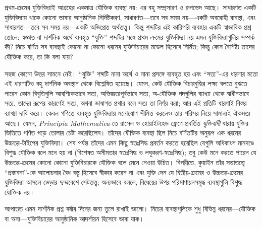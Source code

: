 \documentclass[../../../include/open-logic-section]{subfiles}
\begin{document}


প্রথম-ক্রমের যুক্তিবিদ্যাই আগ্রহের একমাত্র যৌক্তিক ব্যবস্থা নয়:
এর বহু সম্প্রসারণ ও রূপভেদ আছে। সাধারণত একটি যুক্তিবিদ্যায় থাকে কোনো
ভাষার আনুষ্ঠানিক নির্দিষ্টকরণ, সাধারণত---তবে সব সময় নয়---একটি
অবরোহী ব্যবস্থা, এবং সাধারণত---তবে সব সময় নয়---একটি অভিপ্রেত
অর্থতত্ত্ব। কিন্তু শব্দটির এই কারিগরি ব্যবহার একটি স্বাভাবিক প্রশ্ন
তোলে: স্বজ্ঞাত বা দার্শনিক অর্থে ব্যবহৃত “যুক্তি” শব্দটির সঙ্গে
প্রথম-ক্রমের যুক্তিবিদ্যা নয় এমন যুক্তিবিদ্যাগুলির সম্পর্ক কী? নিচে
বর্ণিত সব ব্যবস্থাই কোনো না কোনো ধরনের যুক্তিবিচারের মডেল হিসেবে
নির্মিত; কিন্তু কোন বৈশিষ্ট্য তাদের যৌক্তিক করে, তা কি বলা যায়?

সহজ কোনো উত্তর সামনে নেই। “যুক্তি” শব্দটি নানা অর্থে ও নানা প্রসঙ্গে
ব্যবহৃত হয় এবং “সত্য”-এর ধারণার মতো এই ধারণাটিও বহু দার্শনিক অবস্থান
থেকে বিশ্লেষিত হয়েছে। যেমন, কেউ যৌক্তিক বিচারবুদ্ধির লক্ষ্য বলতে
বুঝতে পারেন কোন বিবৃতিগুলি আবশ্যিকভাবে সত্য, অভিজ্ঞতাপূর্বভাবে সত্য,
অ-যৌক্তিক পদগুলির ব্যাখ্যা থেকে স্বাধীনভাবে সত্য, তাদের রূপের কারণেই
সত্য, অথবা ভাষাগত প্রথার বলে সত্য তা নির্ণয় করা; আর এই প্রতিটি
ধারণাই বিস্তর ব্যাখ্যা দাবি করে। কেবল গণিতে ব্যবহৃত যুক্তিবিদ্যায়
মনোযোগ সীমিত করলেও তার পরিসর নিয়ে সামান্যই ঐকমত্য আছে। যেমন,
\textit{Principia Mathematica}-তে রাসেল ও হোয়াইটহেড ফ্রেগে-প্রবর্তিত
{\em যুক্তিবাদী} ধারায় যুক্তির ভিত্তিতে গণিত গড়ে তোলার চেষ্টা
করেছিলেন। তাঁদের যৌক্তিক ব্যবস্থা ছিল নিচে বর্ণিতটির অনুরূপ এক ধরনের
উচ্চতর-টাইপের যুক্তিবিদ্যা। শেষ পর্যন্ত তাঁদের এমন কিছু স্বতঃসিদ্ধ
প্রবর্তন করতে হয়েছিল যেগুলি অধিকাংশ মানদণ্ডে বিশুদ্ধ যৌক্তিক বলে মনে
হয় না (বিশেষত অসীমতার স্বতঃসিদ্ধ ও লঘুকরণ-স্বতঃসিদ্ধ); তবু কেউ মনে
করতে পারেন যে উচ্চতর-ক্রমের কোনো কোনো যুক্তিবিচারকে যৌক্তিক বলে মেনে
নেওয়া উচিত। বিপরীতে, কুয়াইন তাঁর সত্তাতত্ত্বে “প্রস্তাবনা”-কে
আলোচনার বৈধ বস্তু হিসেবে স্বীকার করেন না এবং যুক্তি দেন যে
দ্বিতীয়-ক্রমের ও উচ্চতর-ক্রমের যুক্তিবিদ্যা আসলে ভেড়ার ছদ্মবেশে
সেটতত্ত্ব; অন্যভাবে বললে, বিধেয়ের উপর পরিমাণায়নসমৃদ্ধ ব্যবস্থাগুলি
বিশুদ্ধ যৌক্তিক নয়।

আপাতত এমন দার্শনিক প্রশ্ন বর্ষার দিনের জন্য তুলে রাখাই ভালো। নিচের
ব্যবস্থাগুলিকে শুধু বিভিন্ন ধরনের---যৌক্তিক বা অন্য---যুক্তিবিচারের
আনুষ্ঠানিক আদর্শায়ন হিসেবে ভাবা যাক।
\end{document}
